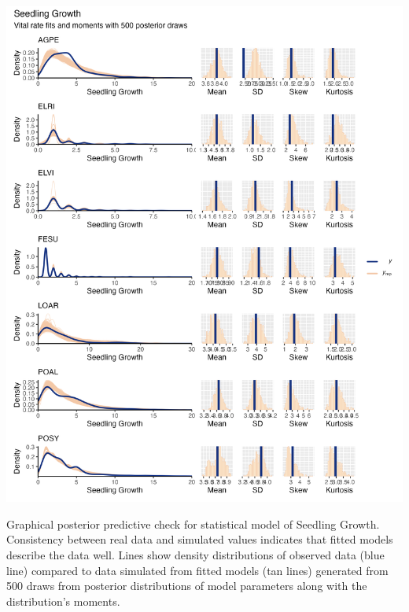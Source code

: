 \documentclass[lineno, sn-basic]{sn-jnl}%
\begin{document}
\begin{myfigure}[H]
	\centering
	\includegraphics[width = \linewidth]{seedgrowbyspecies_densplot.png}
	\caption[Graphical posterior predictive check for statistical model of Seedling Growth]{Graphical posterior predictive check for statistical model of Seedling Growth. Consistency between real data and simulated values indicates that fitted models describe the data well. Lines show density distributions of observed data (blue line) compared to data simulated from fitted models (tan lines) generated from 500 draws from posterior distributions of model parameters along with the distribution's moments.}
\end{myfigure}
\end{document}
